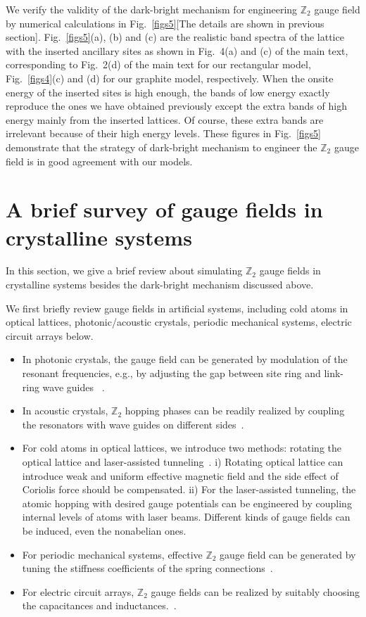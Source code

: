 \documentclass[aps,prl,twocolumn,noshowpacs,superscriptaddress]{revtex4-1}
\def \Z {\mathbb{Z}}
\begin{document}
We verify the validity of the dark-bright mechanism for engineering $ \Z_2 $ gauge field by numerical calculations in Fig.~\ref{figs5}[The details are shown in previous section]. Fig.~\ref{figs5}(a), (b) and (c) are the realistic band spectra of the lattice with the inserted ancillary sites as shown in Fig.~4(a) and (c) of the main text, corresponding to Fig.~2(d) of the main text for our rectangular model, Fig.~\ref{figs4}(c) and (d) for our graphite model, respectively. When the onsite energy of the inserted sites is high enough, the bands of low energy exactly reproduce the ones we have obtained previously except the extra bands of high energy mainly from the inserted lattices. Of course, these extra bands are irrelevant because of their high energy levels. These figures in Fig.~\ref{figs5} demonstrate that the strategy of dark-bright mechanism to engineer the $ \Z_2 $ gauge field is in good agreement with our models.

\section{A brief survey of gauge fields in crystalline systems}
In this section, we give a brief review about simulating $ \Z_2 $ gauge fields in crystalline systems besides the dark-bright mechanism discussed above. 

We first briefly review gauge fields in artificial systems, including cold atoms in optical lattices, photonic/acoustic crystals, periodic mechanical systems, electric circuit arrays below.
\begin{itemize}
	\item In photonic crystals, the gauge field can be generated by modulation of the resonant frequencies, e.g., by adjusting the gap between site ring and link-ring wave guides ~\cite{Ozawa2019,Mittal2019}.
	\item In acoustic crystals, $\mathbb{Z}_2$ hopping phases can be readily realized by coupling the resonators with wave guides on different sides~\cite{Ma2019,Xue2020}.
	\item For cold atoms in optical lattices, we introduce two methods: rotating the optical lattice and laser-assisted tunneling~\cite{Dalibard2011,Zhang2018,Cooper2019}. i) Rotating optical lattice can introduce weak and uniform effective magnetic field and the side effect of Coriolis force should be compensated. ii) For the laser-assisted tunneling, the atomic hopping with desired gauge potentials can be engineered by coupling internal levels of atoms with laser beams. Different kinds of gauge fields can be induced, even the nonabelian ones.
	\item For periodic mechanical systems, effective $\mathbb{Z}_2$ gauge field can be generated by tuning the stiffness coefficients of the spring connections~\cite{Prodan2009}.
	\item For electric circuit arrays, $\mathbb{Z}_2$ gauge fields can be realized by suitably choosing the capacitances and inductances.~\cite{Imhof2018,Yu2020}.
\end{itemize}
\end{document}
